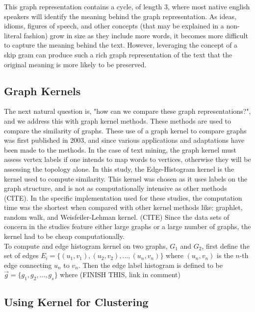 This graph representation contains a cycle, of length 3, where most native english speakers will identify the meaning behind the graph representation. As ideas, idioms, figures of speech, and other concepts (that may be explained in a non-literal fashion) grow in size as they include more words, it becomes more difficult to capture the meaning behind the text. However, leveraging the concept of a skip gram can produce such a rich graph representation of the text that the original meaning is more likely to be preserved. \\

\subsection{ Graph Kernels}
The next natural question is, "how can we compare these graph representations?", and we address this with graph kernel methods. These methods are used to compare the similarity of graphs. These use of a graph kernel to compare graphs was first published in 2003, and since various applications and adaptations have been made to the methods. In the case of text mining, the graph kernel must assess vertex labels \textemdash if one intends to map words to vertices, otherwise they will be assessing the topology alone. In this study, the Edge-Histogram kernel is the kernel used to compute similarity. This kernel was chosen as it uses labels on the graph structure, and is not as computationally intensive as other methods (CITE). In the specific implementation used for these studies, the computation time was the shortest when compared with other kernel methods like: graphlet, random walk, and Weisfeiler-Lehman kernel. (CITE) Since the data sets of concern in the studies feature either large graphs or a large number of graphs, the kernel had to be cheap computationally.\\

To compute and edge histogram kernel on two graphs, $G_1$ and $G_2$, first define the set of edges $E_i =\{ (u_1,v_1), (u_2,v_2), ... , (u_n,v_n) \}$ where $(u_n,v_n)$ is the $n$-th edge connecting $u_n$ to $v_n$. Then the edge label histogram is defined to be $\vec{g} = \{ g_1, g_2, ... , g_s\}$ where 
(FINISH THIS, link in comment)

\subsection{Using Kernel for Clustering}

